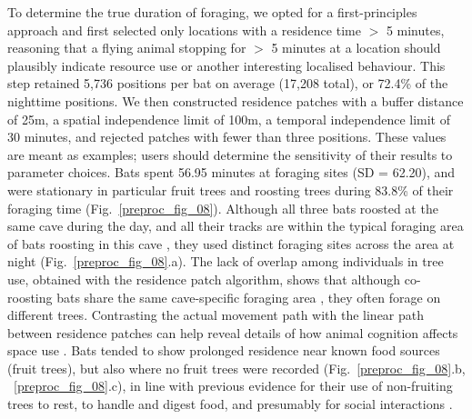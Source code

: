     To determine the true duration of foraging, we opted for a first-principles approach and first selected only locations with a residence time $>$ 5 minutes, reasoning that a flying animal stopping for $>$ 5 minutes at a location should plausibly indicate resource use or another interesting localised behaviour.
    This step retained 5,736 positions per bat on average (17,208 total), or 72.4\% of the nighttime positions.
    We then constructed residence patches with a buffer distance of 25m, a spatial independence limit of 100m, a temporal independence limit of 30 minutes, and rejected patches with fewer than three positions.
    These values are meant as examples; users should determine the sensitivity of their results to parameter choices.
    Bats spent 56.95 minutes at foraging sites (SD = 62.20), and were stationary in particular fruit trees and roosting trees during 83.8\% of their foraging time (Fig.~\ref{preproc_fig_08}).
    Although all three bats roosted at the same cave during the day, and all their tracks are within the typical foraging area of bats roosting in this cave \citep{lourie2021}, they used distinct foraging sites across the area at night (Fig.~\ref{preproc_fig_08}.a). The lack of overlap among individuals in tree use, obtained with the residence patch algorithm, shows that although co-roosting bats share the same cave-specific foraging area \citep{lourie2021}, they often forage on different trees.
    Contrasting the actual movement path with the linear path between residence patches can help reveal details of how animal cognition affects space use \citep{toledo2020}.
    Bats tended to show prolonged residence near known food sources (fruit trees), but also where no fruit trees were recorded (Fig.~\ref{preproc_fig_08}.b, ~\ref{preproc_fig_08}.c), in line with previous evidence for their use of non-fruiting trees to rest, to handle and digest food, and presumably for social interactions \citep{tsoar2011}.

